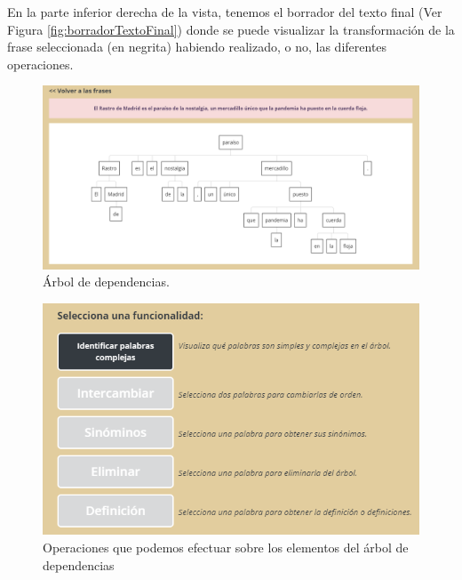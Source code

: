  En la parte inferior derecha de la vista, tenemos el borrador del texto final (Ver Figura \ref{fig:borradorTextoFinal}) donde se puede visualizar la transformación de la frase seleccionada (en negrita) habiendo realizado, o no, las diferentes operaciones. 
\begin{figure}[h!]
	\centering	
	\includegraphics[scale=0.6]{Imagenes/Figuras/arbol}	
	\caption{Árbol de dependencias.}
	\label{fig:arbolDependencias}
\end{figure}
\begin{figure}[h!]
	\centering
	\includegraphics[scale=1.0]{Imagenes/Figuras/botonesFuncionales}
		\caption{Operaciones que podemos efectuar sobre los elementos del árbol de dependencias}
	\label{fig:botonesFuncionales}
\end{figure}
